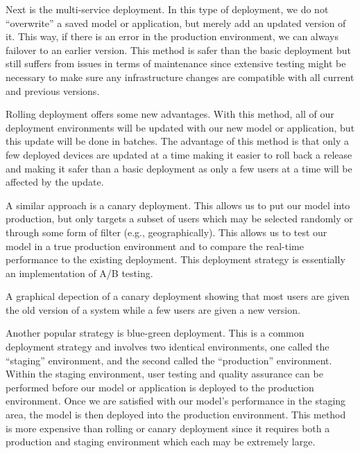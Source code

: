 {{{{    Next is the multi-service deployment. In this type of deployment, we do not “overwrite” a saved model or application, but merely add an updated version of it. This way, if there is an error in the production environment, we can always failover to an earlier version. This method is safer than the basic deployment but still suffers from issues in terms of maintenance since extensive testing might be necessary to make sure any infrastructure changes are compatible with all current and previous versions.
    
    Rolling deployment offers some new advantages. With this method, all of our deployment environments will be updated with our new model or application, but this update will be done in batches. The advantage of this method is that only a few deployed devices are updated at a time making it easier to roll back a release and making it safer than a basic deployment as only a few users at a time will be affected by the update.
    
    A similar approach is a canary deployment. This allows us to put our model into production, but only targets a subset of users which may be selected randomly or through some form of filter (e.g., geographically). This allows us to test our model in a true production environment and to compare the real-time performance to the existing deployment. This deployment strategy is essentially an implementation of A/B testing.
    
    
    A graphical depection of a canary deployment showing that most users are given the old version of a system while a few users are given a new version.
    
    Another popular strategy is blue-green deployment. This is a common deployment strategy and involves two identical environments, one called the “staging” environment, and the second called the “production” environment. Within the staging environment, user testing and quality assurance can be performed before our model or application is deployed to the production environment. Once we are satisfied with our model’s performance in the staging area, the model is then deployed into the production environment. This method is more expensive than rolling or canary deployment since it requires both a production and staging environment which each may be extremely large. 
    
    
}}}}
